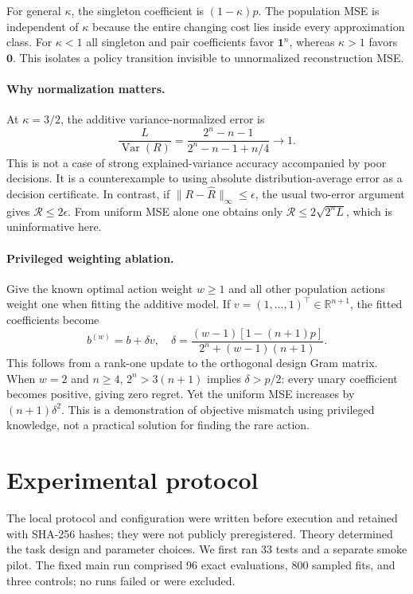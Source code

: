 \documentclass[10pt]{article}
\newcommand{\one}{\mathbf{1}}
\begin{document}
For general $\kappa$, the singleton coefficient is $(1-\kappa)p$. The population MSE is independent of $\kappa$ because the entire changing cost lies inside every approximation class. For $\kappa<1$ all singleton and pair coefficients favor $\one^n$, whereas $\kappa>1$ favors $\mathbf0$. This isolates a policy transition invisible to unnormalized reconstruction MSE.

\paragraph{Why normalization matters.}
At $\kappa=3/2$, the additive variance-normalized error is
\begin{equation}
 \frac{L}{\operatorname{Var}(R)}=
 \frac{2^n-n-1}{2^n-n-1+n/4}\longrightarrow1.
\end{equation}
This is not a case of strong explained-variance accuracy accompanied by poor decisions. It is a counterexample to using absolute distribution-average error as a decision certificate. In contrast, if $\|R-\widehat R\|_\infty\leq\epsilon$, the usual two-error argument gives $\mathcal R\leq2\epsilon$. From uniform MSE alone one obtains only $\mathcal R\leq2\sqrt{2^nL}$, which is uninformative here.

\paragraph{Privileged weighting ablation.}
Give the known optimal action weight $w\geq1$ and all other population actions weight one when fitting the additive model. If $v=(1,\ldots,1)^\top\in\mathbb R^{n+1}$, the fitted coefficients become
\begin{equation}
 b^{(w)}=b+\delta v,\quad
 \delta=\frac{(w-1)[1-(n+1)p]}{2^n+(w-1)(n+1)}.\label{eq:anchor}
\end{equation}
This follows from a rank-one update to the orthogonal design Gram matrix. When $w=2$ and $n\geq4$, $2^n>3(n+1)$ implies $\delta>p/2$: every unary coefficient becomes positive, giving zero regret. Yet the uniform MSE increases by $(n+1)\delta^2$. This is a demonstration of objective mismatch using privileged knowledge, not a practical solution for finding the rare action.

\section{Experimental protocol}
The local protocol and configuration were written before execution and retained with SHA-256 hashes; they were not publicly preregistered. Theory determined the task design and parameter choices. We first ran 33 tests and a separate smoke pilot. The fixed main run comprised 96 exact evaluations, 800 sampled fits, and three controls; no runs failed or were excluded.
\end{document}
